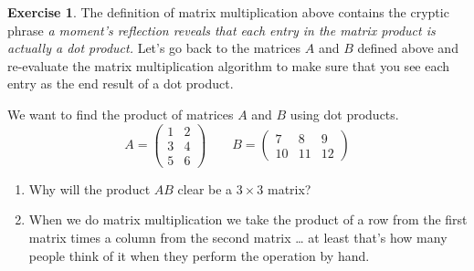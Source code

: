 \documentclass[
]{book}
\providecommand{\tightlist}{%
  \setlength{\itemsep}{0pt}\setlength{\parskip}{0pt}}
\theoremstyle{definition}
\theoremstyle{definition}
\theoremstyle{definition}
\newtheorem{exercise}{Exercise}[chapter]
\theoremstyle{remark}
\begin{document}
\begin{exercise}
\protect\hypertarget{exr:unnamed-chunk-301}{}{\label{exr:unnamed-chunk-301} }The definition of matrix multiplication above contains the cryptic phrase \emph{a moment's reflection reveals that each entry in the matrix product is actually a dot product.} Let's go back to the matrices \(A\) and \(B\) defined above and re-evaluate the matrix multiplication algorithm to make sure that you see each entry as the end result of a dot product.

We want to find the product of matrices \(A\) and \(B\) using dot products.
\[A = \begin{pmatrix} 1 & 2 \\ 3 & 4 \\ 5 & 6 \end{pmatrix} \qquad B =
    \begin{pmatrix} 7 & 8 & 9 \\ 10 & 11 & 12 \end{pmatrix}\]

\begin{enumerate}
\def\labelenumi{\alph{enumi}.}
\tightlist
\item
  Why will the product \(AB\) clear be a \(3 \times 3\) matrix?
\item
  When we do matrix multiplication we take the product of a row from the first matrix times a column from the second matrix \ldots{} at least that's how many people think of it when they perform the operation by hand.


\end{enumerate}
\end{exercise}
\end{document}
